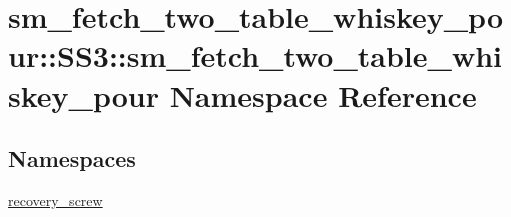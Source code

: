 \hypertarget{namespacesm__fetch__two__table__whiskey__pour_1_1SS3_1_1sm__fetch__two__table__whiskey__pour}{}\section{sm\+\_\+fetch\+\_\+two\+\_\+table\+\_\+whiskey\+\_\+pour\+:\+:S\+S3\+:\+:sm\+\_\+fetch\+\_\+two\+\_\+table\+\_\+whiskey\+\_\+pour Namespace Reference}
\label{namespacesm__fetch__two__table__whiskey__pour_1_1SS3_1_1sm__fetch__two__table__whiskey__pour}
\subsection*{Namespaces}
\begin{DoxyCompactItemize}
\item 
 \hyperlink{namespacesm__fetch__two__table__whiskey__pour_1_1SS3_1_1sm__fetch__two__table__whiskey__pour_1_1recovery__screw}{recovery\+\_\+screw}
\end{DoxyCompactItemize}
